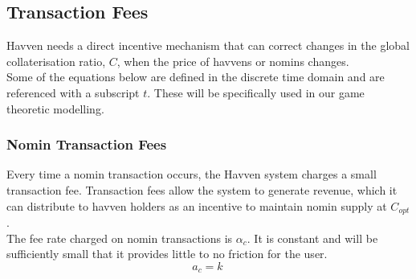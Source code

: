 



\newpage
\subsection{Transaction Fees} Havven needs a direct incentive mechanism that can correct changes in the global collaterisation ratio, $C$, when the price of havvens or nomins changes. \\

\noindent Some of the equations below are defined in the discrete time domain and are referenced with a subscript $t$. These will be specifically used in our game theoretic modelling.

\subsubsection{Nomin Transaction Fees} Every time a nomin transaction occurs, the Havven system charges a small transaction fee. Transaction fees allow the system to generate revenue, which it can distribute to havven holders as an incentive to maintain nomin supply at $C_{opt}$. \\

\noindent The fee rate charged on nomin transactions is $\alpha_c$. It is constant and will be sufficiently small that it provides little to no friction for the user.\\

\begin{equation}
a_c = k \ \label{eq:5}
\end{equation}

